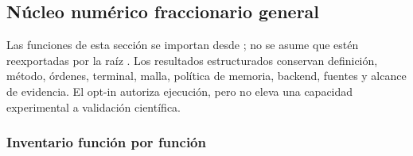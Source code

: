 \subsection{Núcleo numérico fraccionario general}
\label{sec:nucleo-numerico-fraccionario}

Las funciones de esta sección se importan desde
; no se asume que estén reexportadas por
la raíz . Los resultados estructurados conservan
definición, método, órdenes, terminal, malla, política de memoria, backend,
fuentes y alcance de evidencia. El opt-in 
autoriza ejecución, pero no eleva una capacidad experimental a validación
científica.

\subsubsection{Inventario función por función}

